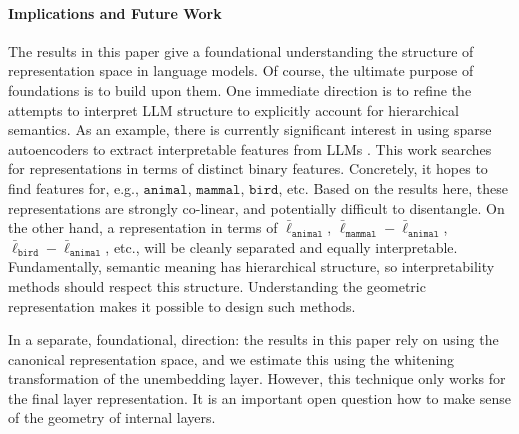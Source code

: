 \documentclass{article}
\newcommand{\ConceptName}[1]{$\mathtt{#1}$}
\newcommand{\ConceptValue}[1]{\texttt{#1}}
\begin{document}
\paragraph{Implications and Future Work}
The results in this paper give a foundational understanding the structure of representation space in language models.
Of course, the ultimate purpose of foundations is to build upon them.
One immediate direction is to refine the attempts to interpret LLM structure to explicitly account for hierarchical semantics. As an example, there is currently significant interest in using sparse autoencoders to extract interpretable features from LLMs .
This work searches for representations in terms of distinct binary features. 
Concretely, it hopes to find features for, e.g., \ConceptName{animal}, \ConceptName{mammal}, \ConceptName{bird}, etc. Based on the results here, these representations are strongly co-linear, and potentially difficult to disentangle. 
On the other hand, a representation in terms of $\bar\ell_{\ConceptValue{animal}}$, $\bar\ell_{\ConceptValue{mammal}} - \bar\ell_\ConceptValue{animal}$, $\bar\ell_{\ConceptValue{bird}} - \bar\ell_\ConceptValue{animal}$, etc., will be cleanly separated and equally interpretable. Fundamentally, semantic meaning has hierarchical structure, so interpretability methods should respect this structure. Understanding the geometric representation makes it possible to design such methods.

In a separate, foundational, direction: the results in this paper rely on using the canonical representation space, and we estimate this using the whitening transformation of the unembedding layer. However, this technique only works for the final layer representation. It is an important open question how to make sense of the geometry of internal layers.

\clearpage
\printbibliography



\clearpage
\appendix
\end{document}
